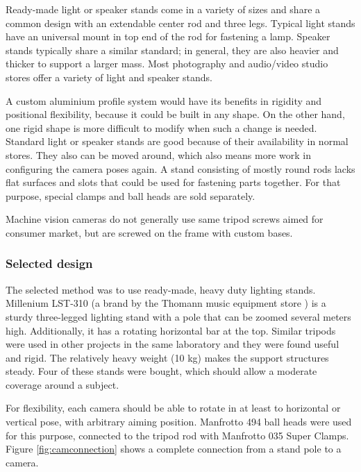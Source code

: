 Ready-made light or speaker stands come in a variety of sizes and share a common design with an extendable center rod and three legs.
Typical light stands have an universal mount in top end of the rod for fastening a lamp.
Speaker stands typically share a similar standard; in general, they are also heavier and thicker to support a larger mass.
Most photography and audio/video studio stores offer a variety of light and speaker stands.

A custom aluminium profile system would have its benefits in rigidity and positional flexibility, because it could be built in any shape.
On the other hand, one rigid shape is more difficult to modify when such a change is needed.
Standard light or speaker stands are good because of their availability in normal stores.
They also can be moved around, which also means more work in configuring the camera poses again.
A stand consisting of mostly round rods lacks flat surfaces and slots that could be used for fastening parts together.
For that purpose, special clamps and ball heads are sold separately.

Machine vision cameras do not generally use same tripod screws aimed for consumer market, but are screwed on the frame with custom bases.

\subsubsection{Selected design}

The selected method was to use ready-made, heavy duty lighting stands.
Millenium LST-310 (a brand by the Thomann music equipment store \cite{thomann}) is a sturdy three-legged lighting stand with a pole that can be zoomed several meters high.
Additionally, it has a rotating horizontal bar at the top.
Similar tripods were used in other projects in the same laboratory and they were found useful and rigid.
The relatively heavy weight (10 kg) makes the support structures steady. %
Four of these stands were bought, which should allow a moderate coverage around a subject. %

For flexibility, each camera should be able to rotate in at least to horizontal or vertical pose, with arbitrary aiming position.
Manfrotto 494 ball heads were used for this purpose, connected to the tripod rod with Manfrotto 035 Super Clamps.
Figure \ref{fig:camconnection} shows a complete connection from a stand pole to a camera.


